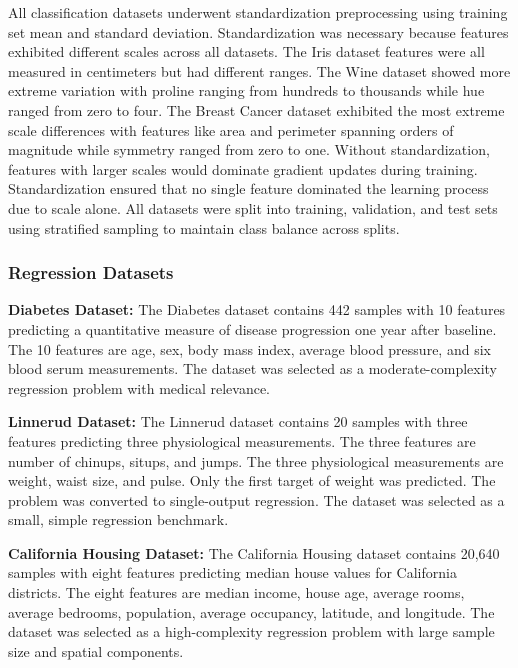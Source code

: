 \documentclass[conference]{IEEEtran}
\begin{document}
All classification datasets underwent standardization preprocessing using training set mean and standard deviation. Standardization was necessary because features exhibited different scales across all datasets. The Iris dataset features were all measured in centimeters but had different ranges. The Wine dataset showed more extreme variation with proline ranging from hundreds to thousands while hue ranged from zero to four. The Breast Cancer dataset exhibited the most extreme scale differences with features like area and perimeter spanning orders of magnitude while symmetry ranged from zero to one. Without standardization, features with larger scales would dominate gradient updates during training. Standardization ensured that no single feature dominated the learning process due to scale alone. All datasets were split into training, validation, and test sets using stratified sampling to maintain class balance across splits.

\subsubsection{Regression Datasets}

\textbf{Diabetes Dataset:}
The Diabetes dataset contains 442 samples with 10 features predicting a quantitative measure of disease progression one year after baseline. The 10 features are age, sex, body mass index, average blood pressure, and six blood serum measurements. The dataset was selected as a moderate-complexity regression problem with medical relevance.

\textbf{Linnerud Dataset:}
The Linnerud dataset contains 20 samples with three features predicting three physiological measurements. The three features are number of chinups, situps, and jumps. The three physiological measurements are weight, waist size, and pulse. Only the first target of weight was predicted. The problem was converted to single-output regression. The dataset was selected as a small, simple regression benchmark.

\textbf{California Housing Dataset:}
The California Housing dataset contains 20,640 samples with eight features predicting median house values for California districts. The eight features are median income, house age, average rooms, average bedrooms, population, average occupancy, latitude, and longitude. The dataset was selected as a high-complexity regression problem with large sample size and spatial components.
\end{document}
